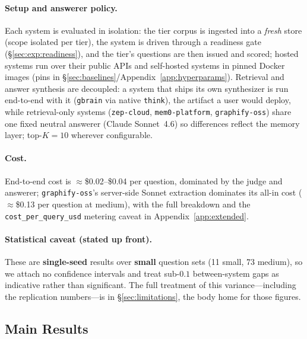 \paragraph{Setup and answerer policy.}\label{sec:exp:setup}
Each system is evaluated in isolation: the tier corpus is ingested into a
\emph{fresh} store (scope isolated per tier), the system is driven through a
readiness gate (\S\ref{sec:exp:readiness}), and the tier's questions are then
issued and scored; hosted systems run over their public APIs and self-hosted
systems in pinned Docker images (pins in \S\ref{sec:baselines}/Appendix~\ref{app:hyperparams}).
Retrieval and answer synthesis are decoupled: a system that ships its own
synthesizer is run end-to-end with it (\texttt{gbrain} via native \texttt{think}),
the artifact a user would deploy, while retrieval-only systems
(\texttt{zep-cloud}, \texttt{mem0-platform}, \texttt{graphify-oss}) share one
fixed neutral answerer (Claude Sonnet~4.6) so differences reflect the memory
layer; top-$K=10$ wherever configurable.

\paragraph{Cost.}
End-to-end cost is $\approx$\$0.02--\$0.04 per question, dominated by the judge
and answerer; \texttt{graphify-oss}'s server-side Sonnet extraction dominates its
all-in cost ($\approx$\$0.13 per question at medium), with the full breakdown and
the \texttt{cost\_per\_query\_usd} metering caveat in
Appendix~\ref{app:extended}.

\paragraph{Statistical caveat (stated up front).}
These are \textbf{single-seed} results over \textbf{small} question sets (11
small, 73 medium), so we attach no confidence intervals and treat sub-$0.1$
between-system gaps as indicative rather than significant. The full treatment of
this variance---including the replication numbers---is in \S\ref{sec:limitations},
the body home for those figures.

\subsection{Main Results}
\label{sec:exp:main}

